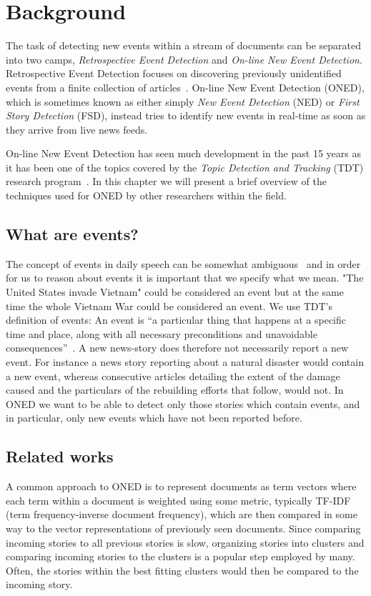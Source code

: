 \chapter{Background}
\label{chapter:background}

The task of detecting new events within a stream of documents can be separated into two camps, \emph{Retrospective Event Detection} and \emph{On-line New Event Detection}. Retrospective Event Detection focuses on discovering previously unidentified events from a finite collection of articles~\cite{yang1998study}. On-line New Event Detection (ONED), which is sometimes known as either simply \emph{New Event Detection} (NED) or \emph{First Story Detection} (FSD), instead tries to identify new events in real-time as soon as they arrive from live news feeds.

On-line New Event Detection has seen much development in the past 15 years as it has been one of the topics covered by the \emph{Topic Detection and Tracking} (TDT) research program~\cite{tdt2004annotation}. In this chapter we will present a brief overview of the techniques used for ONED by other researchers within the field.

\section{What are events?}
The concept of events in daily speech can be somewhat ambiguous~\cite{papka1999online} and in order for us to reason about events it is important that we specify what we mean. "The United States invade Vietnam" could be considered an event but at the same time the whole Vietnam War could be considered an event. We use TDT's definition of events: An event is ``a particular thing that happens at a specific time and place, along with all necessary preconditions and unavoidable consequences''~\cite{tdt2004annotation}. 
A new news-story does therefore not necessarily report a new event. For instance a news story reporting about a natural disaster would contain a new event, whereas consecutive articles detailing the extent of the damage caused and the particulars of the rebuilding efforts that follow, would not. In ONED we want to be able to detect only those stories which contain events, and in particular, only new events which have not been reported before.

\section{Related works}
A common approach to ONED is to represent documents as term vectors where each term within a document is weighted using some metric, typically TF-IDF (term frequency-inverse document frequency), which are then compared in some way to the vector representations of previously seen documents. Since comparing incoming stories to all previous stories is slow, organizing stories into clusters and comparing incoming stories to the clusters is a popular step employed by many. Often, the stories within the best fitting clusters would then be compared to the incoming story.

